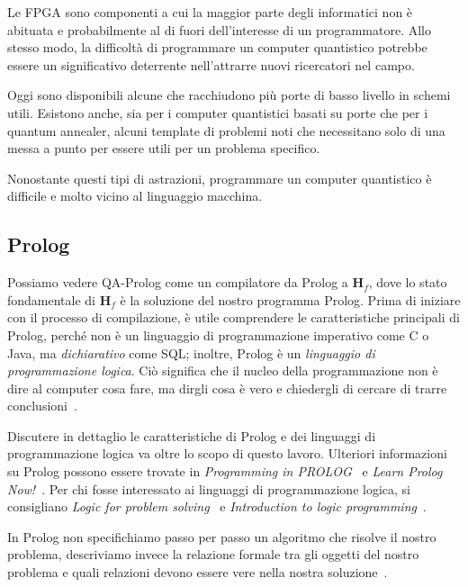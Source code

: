 Le FPGA sono componenti a cui la maggior parte degli informatici non è abituata e probabilmente al di fuori dell'interesse di un programmatore. Allo stesso modo, la difficoltà di programmare un computer quantistico potrebbe essere un significativo deterrente nell'attrarre nuovi ricercatori nel campo.

Oggi sono disponibili alcune  che racchiudono più porte di basso livello in schemi utili. Esistono anche, sia per i computer quantistici basati su porte che per i quantum annealer, alcuni template di problemi noti che necessitano solo di una messa a punto per essere utili per un problema specifico. 

Nonostante questi tipi di astrazioni, programmare un computer quantistico è difficile e molto vicino al linguaggio macchina.

\subsection{Prolog}
Possiamo vedere QA-Prolog come un compilatore da Prolog a $\mathbf{H}_f$, dove lo stato fondamentale di $\mathbf{H}_f$ è la soluzione del nostro programma Prolog. Prima di iniziare con il processo di compilazione, è utile comprendere le caratteristiche principali di Prolog, perché non è un linguaggio di programmazione imperativo come C o Java, ma \emph{dichiarativo} come SQL; inoltre, Prolog è un \emph{linguaggio di programmazione logica}. Ciò significa che il nucleo della programmazione non è dire al computer cosa fare, ma dirgli cosa è vero e chiedergli di cercare di trarre conclusioni~\cite{clocksin2003programming}. 

Discutere in dettaglio le caratteristiche di Prolog e dei linguaggi di programmazione logica va oltre lo scopo di questo lavoro. Ulteriori informazioni su Prolog possono essere trovate in \emph{Programming in PROLOG}~\cite{clocksin2003programming} e \emph{Learn Prolog Now!}~\cite{learn_prolog_now_online}. Per chi fosse interessato ai linguaggi di programmazione logica, si consigliano \emph{Logic for problem solving}~\cite{kowalski1982logic} e \emph{Introduction to logic programming}~\cite{hogger1984introduction}.

In Prolog non specifichiamo passo per passo un algoritmo che risolve il nostro problema, descriviamo invece la relazione formale tra gli oggetti del nostro problema e quali relazioni devono essere vere nella nostra soluzione~\cite{clocksin2003programming}.


